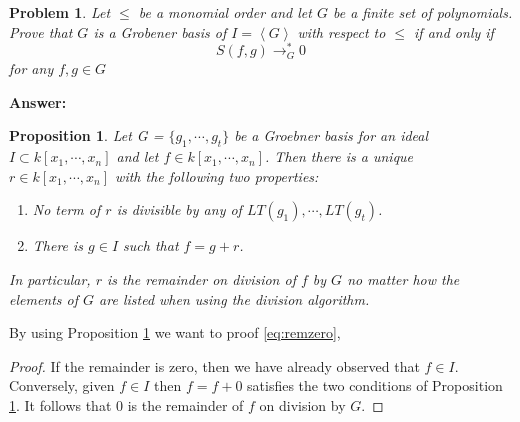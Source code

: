 \documentclass[a4paper,12pt]{article}
\newtheorem{prob}{Problem}[]
\newtheorem{prop}{Proposition}[]
\theoremstyle{definition}
\DeclareMathOperator*{\rightarrowmod}{\longrightarrow}
\begin{document}
\begin{prob}
	Let $\leq$ be a monomial order and let $G$ be a finite set of polynomials. Prove that $G$ is a Grobener basis of $I=\left< G \right>$ with respect to $\leq$ if and only if
	\begin{equation}\label{eq:remzero}
	S(f,g) \rightarrowmod_G^* 0
	\end{equation}
	for any $f,g \in G$
\end{prob}
\textbf{Answer:}
\begin{prop}\label{prop:gbasis}
	Let G = $\{g_1, \cdots, g_t\}$ be a Groebner basis for an ideal $I \subset k[x_1,\cdots, x_n]$ and let $f \in k[x_1,\cdots, x_n]$. Then there is a unique $r \in k[x_1,\cdots, x_n]$ with
	the following two properties:
	\begin{enumerate}[label=(\roman*)]
		\item No term of $r$ is divisible by any of $LT(g_1),\cdots, LT(g_t)$.
		\item There is $g \in I$ such that $f = g + r$.
	\end{enumerate}
	In particular, $r$ is the remainder on division of $f$ by $G$ no matter how the elements of $G$
	are listed when using the division algorithm.
\end{prop}
By using Proposition \ref{prop:gbasis} we want to proof \eqref{eq:remzero},
\begin{proof}
	If the remainder is zero, then we have already observed that $f \in I$. Conversely,
	given $f \in I$ then $f = f + 0$ satisfies the two conditions of Proposition \ref{prop:gbasis}. It follows
	that 0 is the remainder of $f$ on division by $G$.
\end{proof}
\end{document}
